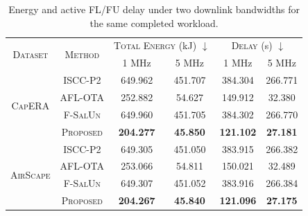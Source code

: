 \begin{table}[t]
\centering
\caption{Energy and active FL/FU delay under two downlink bandwidths for the same completed workload.}
\label{tab:vlm_downlink_resources}
\footnotesize
\renewcommand{\arraystretch}{1.0}
\setlength{\tabcolsep}{3pt}

\begin{tabular}{c|c|c|c|c|c}
\toprule
\multirow{2}{*}{\textsc{Dataset}} & \multirow{2}{*}{\textsc{Method}}
        & \multicolumn{2}{c|}{\textsc{Total Energy} (kJ) $\downarrow$}
        & \multicolumn{2}{c}{\textsc{Delay} (s) $\downarrow$} \\
        & & 1 MHz & 5 MHz & 1 MHz & 5 MHz \\
\midrule
\multirow{4}{*}{\textsc{CapERA}} & \textsc{ISCC-P2} & 649.962 & 451.707 & 384.304 & 266.771 \\
 & \textsc{AFL-OTA} & 252.882 & 54.627 & 149.912 & 32.380 \\
 & \textsc{F-SalUn} & 649.960 & 451.705 & 384.302 & 266.770 \\
 & \textsc{Proposed} & \textbf{204.277} & \textbf{45.850} & \textbf{121.102} & \textbf{27.181} \\
\midrule
\multirow{4}{*}{\textsc{AirScape}} & \textsc{ISCC-P2} & 649.305 & 451.050 & 383.915 & 266.382 \\
 & \textsc{AFL-OTA} & 253.066 & 54.811 & 150.021 & 32.489 \\
 & \textsc{F-SalUn} & 649.307 & 451.052 & 383.916 & 266.384 \\
 & \textsc{Proposed} & \textbf{204.267} & \textbf{45.840} & \textbf{121.096} & \textbf{27.175} \\
\bottomrule
\end{tabular}
\end{table}
